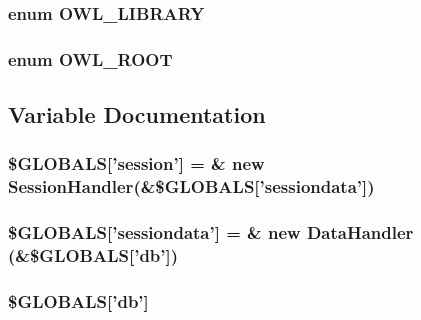\hypertarget{index_8php_74eed08508c8b70677c4167acf49e427}{
\subsubsection{\setlength{\rightskip}{0pt plus 5cm}enum {\bf OWL\_\-LIBRARY}}}
\label{index_8php_74eed08508c8b70677c4167acf49e427}


\hypertarget{index_8php_35612f9a6bd7277982731a74593272c4}{
\subsubsection{\setlength{\rightskip}{0pt plus 5cm}enum {\bf OWL\_\-ROOT}}}
\label{index_8php_35612f9a6bd7277982731a74593272c4}




\subsection{Variable Documentation}
\hypertarget{index_8php_95ec104c636100b9022c09964e2b0725}{
\subsubsection{\setlength{\rightskip}{0pt plus 5cm}\$GLOBALS\mbox{[}'session'\mbox{]} = \& new {\bf SessionHandler}(\&\$GLOBALS\mbox{[}'sessiondata'\mbox{]})}}
\label{index_8php_95ec104c636100b9022c09964e2b0725}


\hypertarget{index_8php_df2bd79dcae941587d8b69d6ece9104a}{
\subsubsection{\setlength{\rightskip}{0pt plus 5cm}\$GLOBALS\mbox{[}'sessiondata'\mbox{]} = \& new {\bf DataHandler} (\&\$GLOBALS\mbox{[}'db'\mbox{]})}}
\label{index_8php_df2bd79dcae941587d8b69d6ece9104a}


\hypertarget{index_8php_14159e18d9b64fd1e16054f784eda311}{
\subsubsection{\setlength{\rightskip}{0pt plus 5cm}\$GLOBALS\mbox{[}'db'\mbox{]}}}
\label{index_8php_14159e18d9b64fd1e16054f784eda311}


